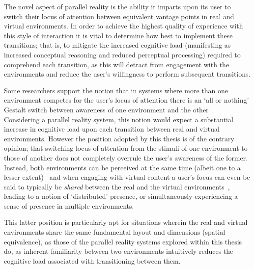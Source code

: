 The novel aspect of parallel reality is the ability it imparts upon its user to switch their locus of attention between equivalent vantage points in real and virtual environments. In order to achieve the highest quality of experience with this style of interaction it is vital to determine how best to implement these transitions; that is, to mitigate the increased cognitive load (manifesting as increased conceptual reasoning and reduced perceptual processing) required to comprehend each transition, as this will detract from engagement with the environments and reduce the user's willingness to perform subsequent transitions.



Some researchers support the notion that in systems where more than one environment competes for the user's locus of attention there is an `all or nothing' Gestalt switch between awareness of one environment and the other~\cite{Slater2002}. Considering a parallel reality system, this notion would expect a substantial increase in cognitive load upon each transition between real and virtual environments. However the position adopted by this thesis is of the contrary opinion; that switching locus of attention from the stimuli of one environment to those of another does not completely overrule the user's awareness of the former. Instead, both environments can be perceived at the same time (albeit one to a lesser extent)~\cite{Ijsselsteijn2001} and when engaging with virtual content a user's focus can even be said to typically be \textit{shared} between the real and the virtual environments~\cite{Waterworth2001}, leading to a notion of `distributed' presence, or simultaneously experiencing a sense of presence in multiple environments.

This latter position is particularly apt for situations wherein the real and virtual environments share the same fundamental layout and dimensions (spatial equivalence), as those of the parallel reality systems explored within this thesis do, as inherent familiarity between two environments intuitively reduces the cognitive load associated with transitioning between them.

